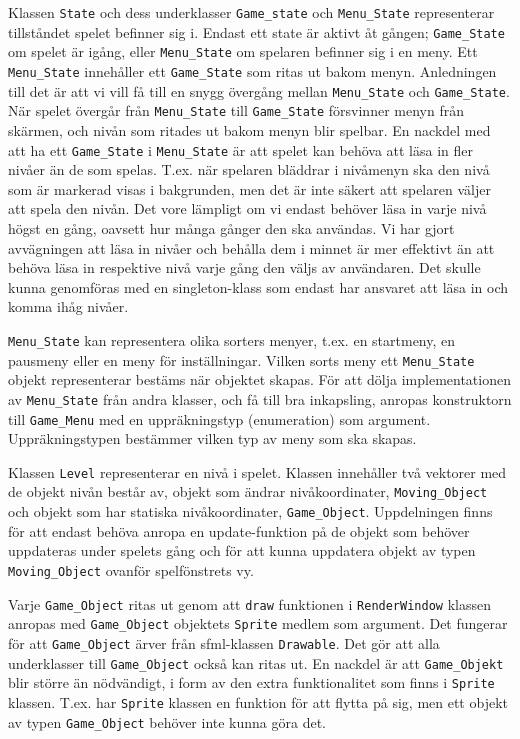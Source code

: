 \documentclass{TDP005mall}
\begin{document}
Klassen \verb|State| och dess underklasser \verb|Game_state| och \verb|Menu_State| representerar tillståndet spelet befinner sig i. Endast ett state är aktivt åt gången; \verb|Game_State| om spelet är igång, eller \verb|Menu_State| om spelaren befinner sig i en meny. Ett \verb|Menu_State| innehåller ett \verb|Game_State| som ritas ut bakom menyn. Anledningen till det är att vi vill få till en snygg övergång mellan \verb|Menu_State| och \verb|Game_State|. När spelet övergår från \verb|Menu_State| till \verb|Game_State| försvinner menyn från skärmen, och nivån som ritades ut bakom menyn blir spelbar. En nackdel med att ha ett \verb|Game_State| i \verb|Menu_State| är att spelet kan behöva att läsa in fler nivåer än de som spelas. T.ex. när spelaren bläddrar i nivåmenyn ska den nivå som är markerad visas i bakgrunden, men det är inte säkert att spelaren väljer att spela den nivån. Det vore lämpligt om vi endast behöver läsa in varje nivå högst en gång, oavsett hur många gånger den ska användas. Vi har gjort avvägningen att läsa in nivåer och behålla dem i minnet är mer effektivt än att behöva läsa in respektive nivå varje gång den väljs av användaren. Det skulle kunna genomföras med en singleton-klass som endast har ansvaret att läsa in och komma ihåg nivåer.

\verb|Menu_State| kan representera olika sorters menyer, t.ex. en startmeny, en pausmeny eller en meny för inställningar. Vilken sorts meny ett \verb|Menu_State| objekt representerar bestäms när objektet skapas. För att dölja implementationen av \verb|Menu_State| från andra klasser, och få till bra inkapsling, anropas konstruktorn till \verb|Game_Menu| med en uppräkningstyp (enumeration) som argument. Uppräkningstypen bestämmer vilken typ av meny som ska skapas.

Klassen \verb|Level| representerar en nivå i spelet. Klassen innehåller två vektorer med de objekt nivån består av, objekt som ändrar nivåkoordinater, \verb|Moving_Object| och objekt som har statiska nivåkoordinater, \verb|Game_Object|. Uppdelningen finns för att endast behöva anropa en update-funktion på de objekt som behöver uppdateras under spelets gång och för att kunna uppdatera objekt av typen \verb|Moving_Object| ovanför spelfönstrets vy.

Varje \verb|Game_Object| ritas ut genom att \verb|draw| funktionen i \verb|RenderWindow| klassen anropas med \verb|Game_Object| objektets \verb|Sprite| medlem som argument. Det fungerar för att \verb|Game_Object| ärver från sfml-klassen \verb|Drawable|. Det gör att alla underklasser till \verb|Game_Object| också kan ritas ut. En nackdel är att \verb|Game_Objekt| blir större än nödvändigt, i form av den extra funktionalitet som finns i \verb|Sprite| klassen. T.ex. har \verb|Sprite| klassen en funktion för att flytta på sig, men ett objekt av typen \verb|Game_Object| behöver inte kunna göra det.
\end{document}
